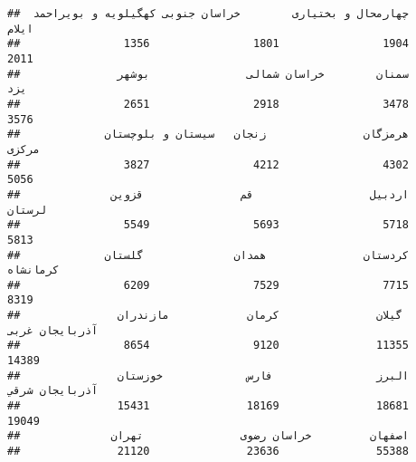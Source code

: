 \documentclass[
]{article}
\begin{document}
\begin{verbatim}
##  چهارمحال و بختیاری        خراسان جنوبی کهگیلویه و بویراحمد               ایلام 
##                1356                1801                1904                2011 
##               سمنان        خراسان شمالی               بوشهر                 یزد 
##                2651                2918                3478                3576 
##             هرمزگان               زنجان   سیستان و بلوچستان               مرکزی 
##                3827                4212                4302                5056 
##              اردبیل                  قم               قزوین              لرستان 
##                5549                5693                5718                5813 
##             کردستان               همدان              گلستان            کرمانشاه 
##                6209                7529                7715                8319 
##               گیلان               کرمان            مازندران      آذربايجان غربی 
##                8654                9120               11355               14389 
##               البرز                فارس             خوزستان      آذربايجان شرقي 
##               15431               18169               18681               19049 
##              اصفهان         خراسان رضوی               تهران 
##               21120               23636               55388
\end{verbatim}
\end{document}
